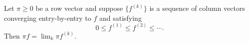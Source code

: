 Let $\pi \geq 0$ be a row vector and suppose $\{f^{(k)}\}$ is a sequence of column vectors converging entry-by-entry to $f$ and satisfying
$$0 \leq f^{(1)} \leq f^{(2)} \leq \cdots.$$
Then $\pi f = \lim_k \pi f^{(k)}$.
